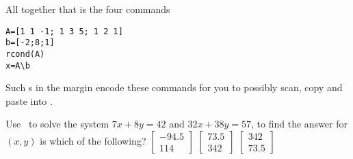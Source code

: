 \begin{example}
\begin{solution}
\begin{enumerate}
\end{enumerate}
All together that is the four commands
\begin{verbatim}
A=[1 1 -1; 1 3 5; 1 2 1]
b=[-2;8;1]
rcond(A)
x=A\b
\end{verbatim}
\setbox\ajrqrbox\hbox{}%
\marginajrbox%
\ifinQRcodes
Such s in the margin encode these commands for you to possibly scan, copy and paste into \script.
\fi
\end{solution}
\end{example}



\begin{activity}
Use \script\ to solve the system \(7x+8y=42\) and \(32x+38y=57\), to find the answer for \((x,y)\) is which of the following?
{\(\begin{bmatrix} -94.5\\114 \end{bmatrix}\)}
{\(\begin{bmatrix} 73.5\\342 \end{bmatrix}\)}
{\(\begin{bmatrix} 342\\73.5 \end{bmatrix}\)}
\end{activity}





